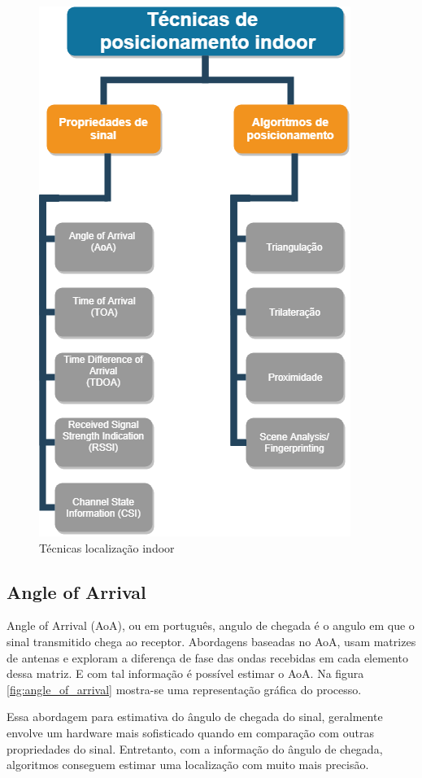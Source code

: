 \begin{figure}[H]
	\centering 
	\includegraphics[scale = 0.4]{images/tecnicas_posicionamento_indoor.png}
	\caption{Técnicas localização indoor}
	\label{fig:tecnicas_posicionamento_indoor}
  \end{figure}


\subsection{Angle of Arrival}

Angle of Arrival (AoA), ou em português, angulo de chegada é o angulo em que o sinal transmitido chega ao receptor. Abordagens baseadas no AoA, usam matrizes de antenas e exploram a diferença de fase das ondas recebidas em cada elemento dessa matriz. E com tal informação é possível estimar o AoA. Na figura \ref{fig:angle_of_arrival} mostra-se uma representação gráfica do processo.

Essa abordagem para estimativa do ângulo de chegada do sinal, geralmente envolve um hardware mais sofisticado quando em comparação com outras propriedades do sinal. Entretanto, com a informação do ângulo de chegada, algoritmos conseguem estimar uma localização com muito mais precisão.\cite{art2}


